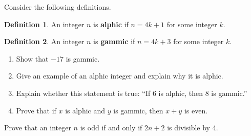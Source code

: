 \documentclass{article}
\theoremstyle{definition}
\newtheorem*{definition}{Definition}
\begin{document}
\begin{question}{15}
    Consider the following definitions.
	\begin{definition}
	 An integer $n$ is \textbf{alphic} if $n=4k+1$ for some integer $k$.
	\end{definition}
	\begin{definition}
	 An integer $n$ is \textbf{gammic} if $n=4k+3$ for some integer $k$.
	\end{definition}
        \begin{enumerate}
           \item Show that $-17$ is gammic.
           \item Give an example of an alphic integer and explain why it is alphic.
           \item Explain whether this statement is true: ``If $6$ is alphic, then $8$ is gammic.''
           \item Prove that if $x$ is alphic and $y$ is gammic, then $x+y$ is even.
        \end{enumerate}
\end{question}
\begin{solution}
\end{solution}

\begin{question}{9}
    Prove that an integer $n$ is odd if and only if $2n+2$ is divisible by 4.
\end{question}
\begin{solution}
\end{solution}
\end{document}
